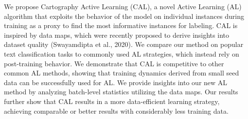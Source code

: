 We propose Cartography Active Learning (CAL), a novel Active Learning (AL) algorithm that exploits  the behavior of the model on individual instances during training as a proxy to find the most informative instances for labeling. CAL is inspired by data maps, which were recently proposed to derive insights into dataset quality (Swayamdipta et al., 2020). We compare our method on popular text classification tasks to commonly used AL strategies, which instead rely on post-training behavior. We demonstrate that CAL is competitive to other common AL methods, showing that training dynamics derived from small seed data can be successfully used for AL. We provide insights into our new AL method by analyzing batch-level statistics utilizing the data maps. Our results further show that CAL results in a more data-efficient learning strategy, achieving comparable or better results with considerably less training data.
